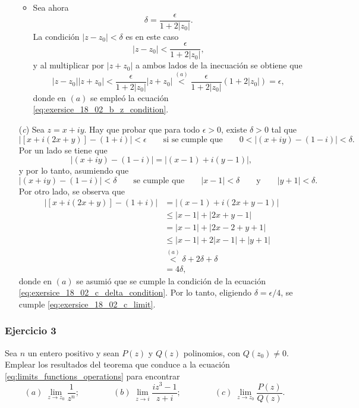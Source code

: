 \documentclass[a4paper]{report}
\begin{document}
\begin{enumerate}
\begin{itemize}
  \item Sea ahora
  \[
   \delta=\frac{\epsilon}{1+2|z_0|}.
  \]
  La condición \(|z-z_0|<\delta\) es en este caso
  \[
   |z-z_0|<\frac{\epsilon}{1+2|z_0|},
  \]
  y al multiplicar por \(|z+z_0|\) a ambos lados de la inecuación se obtiene que 
  \[
   |z-z_0||z+z_0|<\frac{\epsilon}{1+2|z_0|}|z+z_0|\overset{(a)}{<}\frac{\epsilon}{1+2|z_0|}(1+2|z_0|)=\epsilon,
  \]
  donde en \((a)\) se empleó la ecuación \ref{eq:exersice_18_02_b_z_condition}.
 \end{itemize} 
 \item[(\textit{c})] Sea \(z=x+iy\). Hay que probar que para todo \(\epsilon>0\), existe \(\delta>0\) tal que
 \begin{equation}\label{eq:exersice_18_02_c_limit}
  |[x+i(2x+y)]-(1+i)|<\epsilon
  \qquad\textrm{si se cumple que}\qquad
  0<|(x+iy)-(1-i)|<\delta.
 \end{equation}
 Por un lado se tiene que 
 \[
  |(x+iy)-(1-i)|=|(x-1)+i(y-1)|,
 \]
 y por lo tanto, asumiendo que
 \begin{equation}\label{eq:exersice_18_02_c_delta_condition}
  |(x+iy)-(1-i)|<\delta
  \qquad\textrm{se cumple que}\qquad
  |x-1|<\delta\qquad\textrm{y}\qquad|y+1|<\delta.
 \end{equation}
 Por otro lado, se observa que 
 \begin{align*}
  |[x+i(2x+y)]-(1+i)|&=|(x-1)+i(2x+y-1)|\\
   &\leq|x-1|+|2x+y-1|\\
   &=|x-1|+|2x-2+y+1|\\
   &\leq|x-1|+2|x-1|+|y+1|\\
   &\overset{(a)}{<}\delta+2\delta+\delta\\
   &=4\delta,
 \end{align*}
 donde en \((a)\) se asumió que se cumple la condición de la ecuación \ref{eq:exersice_18_02_c_delta_condition}. Por lo tanto, eligiendo \(\delta=\epsilon/4\), se cumple \ref{eq:exersice_18_02_c_limit}.
\end{enumerate}

\subsubsection{Ejercicio 3}

Sea \(n\) un entero positivo y sean \(P(z)\) y \(Q(z)\) polinomios, con \(Q(z_0)\neq0\). Emplear los resultados del teorema que conduce a la ecuación \ref{eq:limits_functions_operations} para encontrar
\[
 (\textit{a})\;\lim_{z\to z_0}\frac{1}{z^n};\qquad\qquad 
 (\textit{b})\;\lim_{z\to i}\frac{iz^3-1}{z+i};\qquad\qquad
 (\textit{c})\;\lim_{z\to z_0}\frac{P(z)}{Q(z)}.
\]
\end{document}
